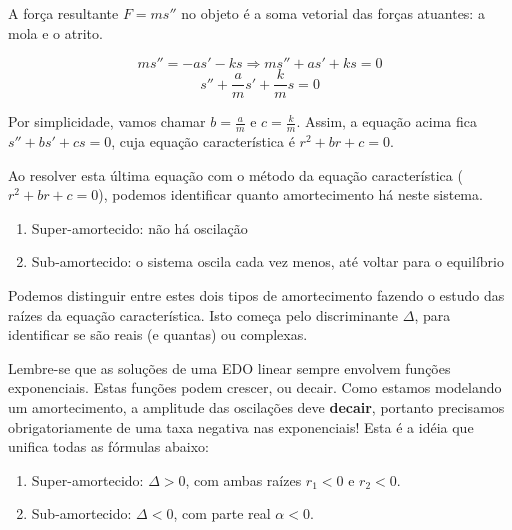 \documentclass[a4paper]{article}
\begin{document}
A força resultante $F=ms''$ no objeto é a soma vetorial das forças
atuantes: a mola e o atrito.

\begin{displaymath}
  ms'' = -as' -ks \Rightarrow   ms'' +as' + ks =0
\end{displaymath}
\begin{displaymath}
  s'' +\frac{a}{m}s' + \frac{k}{m}s  =0
\end{displaymath}

Por simplicidade, vamos chamar $b=\frac{a}{m}$ e
$c=\frac{k}{m}$. Assim, a equação acima fica $s''+bs'+cs=0$, cuja
equação característica é $r^2+br+c=0$.

Ao resolver esta última equação com o método da equação característica
($r^2+br+c=0$), podemos identificar quanto amortecimento há neste sistema.

\begin{enumerate}
\item Super-amortecido: não há oscilação
\item Sub-amortecido: o sistema oscila cada vez menos, até voltar para
  o equilíbrio
\end{enumerate}

Podemos distinguir entre estes dois tipos de amortecimento fazendo o
estudo das raízes da equação característica. Isto começa pelo
discriminante $\Delta$, para identificar se são reais (e quantas) ou
complexas.

Lembre-se que as soluções de uma EDO linear sempre envolvem funções
exponenciais. Estas funções podem crescer, ou decair. Como estamos
modelando um amortecimento, a amplitude das oscilações deve {\bf
  decair}, portanto precisamos obrigatoriamente de uma taxa negativa
nas exponenciais! Esta é a idéia que unifica todas as fórmulas abaixo:

\begin{enumerate}
\item Super-amortecido: $\Delta>0$, com ambas raízes $r_1<0$ e
  $r_2<0$.
\item Sub-amortecido: $\Delta<0$, com parte real $\alpha<0$.
\end{enumerate}
\end{document}
